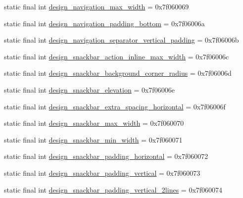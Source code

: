 \begin{DoxyCompactItemize}
\item 
static final int \mbox{\hyperlink{classandroid_1_1support_1_1design_1_1R_1_1dimen_aea61310378807a0bf7cf2f2a8a494681}{design\+\_\+navigation\+\_\+max\+\_\+width}} = 0x7f060069
\item 
static final int \mbox{\hyperlink{classandroid_1_1support_1_1design_1_1R_1_1dimen_a2647e9da0be00a73db532944c5288a3a}{design\+\_\+navigation\+\_\+padding\+\_\+bottom}} = 0x7f06006a
\item 
static final int \mbox{\hyperlink{classandroid_1_1support_1_1design_1_1R_1_1dimen_ad6a3bb1231788391e52c4896d0de39f7}{design\+\_\+navigation\+\_\+separator\+\_\+vertical\+\_\+padding}} = 0x7f06006b
\item 
static final int \mbox{\hyperlink{classandroid_1_1support_1_1design_1_1R_1_1dimen_a6ec8da0fd7402fc33d6180aff7258f88}{design\+\_\+snackbar\+\_\+action\+\_\+inline\+\_\+max\+\_\+width}} = 0x7f06006c
\item 
static final int \mbox{\hyperlink{classandroid_1_1support_1_1design_1_1R_1_1dimen_a469c963201807723e61ebd63d9d31b30}{design\+\_\+snackbar\+\_\+background\+\_\+corner\+\_\+radius}} = 0x7f06006d
\item 
static final int \mbox{\hyperlink{classandroid_1_1support_1_1design_1_1R_1_1dimen_a618410f7930e7304fc24480e003f2f48}{design\+\_\+snackbar\+\_\+elevation}} = 0x7f06006e
\item 
static final int \mbox{\hyperlink{classandroid_1_1support_1_1design_1_1R_1_1dimen_a9d7da239527c985b37edc815e1f67bd8}{design\+\_\+snackbar\+\_\+extra\+\_\+spacing\+\_\+horizontal}} = 0x7f06006f
\item 
static final int \mbox{\hyperlink{classandroid_1_1support_1_1design_1_1R_1_1dimen_ae088decd1622475be59b157ddd788bb6}{design\+\_\+snackbar\+\_\+max\+\_\+width}} = 0x7f060070
\item 
static final int \mbox{\hyperlink{classandroid_1_1support_1_1design_1_1R_1_1dimen_ad801c273260b6b31c3f8b25b24888e31}{design\+\_\+snackbar\+\_\+min\+\_\+width}} = 0x7f060071
\item 
static final int \mbox{\hyperlink{classandroid_1_1support_1_1design_1_1R_1_1dimen_a009e67819dc08e09556179677e7d7209}{design\+\_\+snackbar\+\_\+padding\+\_\+horizontal}} = 0x7f060072
\item 
static final int \mbox{\hyperlink{classandroid_1_1support_1_1design_1_1R_1_1dimen_a7fac1342910fbb66edd76b36ffb0040c}{design\+\_\+snackbar\+\_\+padding\+\_\+vertical}} = 0x7f060073
\item 
static final int \mbox{\hyperlink{classandroid_1_1support_1_1design_1_1R_1_1dimen_a763a99a7ed4d51adad516e2789989919}{design\+\_\+snackbar\+\_\+padding\+\_\+vertical\+\_\+2lines}} = 0x7f060074

\end{DoxyCompactItemize}
